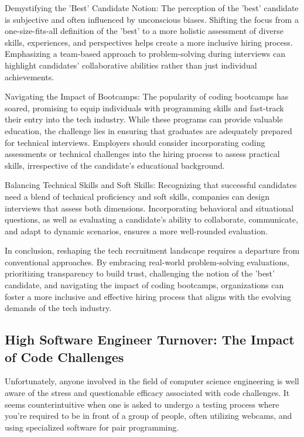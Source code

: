 \documentclass[
    a4paper, %
    10pt, %
    unnumberedsections, %
    twoside, %
]{LTJournalArticle}
\begin{document}
Demystifying the 'Best' Candidate Notion:
The perception of the 'best' candidate is subjective and often influenced by unconscious biases. Shifting the focus from a one-size-fits-all definition of the 'best' to a more holistic assessment of diverse skills, experiences, and perspectives helps create a more inclusive hiring process. Emphasizing a team-based approach to problem-solving during interviews can highlight candidates' collaborative abilities rather than just individual achievements.

Navigating the Impact of Bootcamps:
The popularity of coding bootcamps has soared, promising to equip individuals with programming skills and fast-track their entry into the tech industry. While these programs can provide valuable education, the challenge lies in ensuring that graduates are adequately prepared for technical interviews. Employers should consider incorporating coding assessments or technical challenges into the hiring process to assess practical skills, irrespective of the candidate's educational background.

Balancing Technical Skills and Soft Skills:
Recognizing that successful candidates need a blend of technical proficiency and soft skills, companies can design interviews that assess both dimensions. Incorporating behavioral and situational questions, as well as evaluating a candidate's ability to collaborate, communicate, and adapt to dynamic scenarios, ensures a more well-rounded evaluation.

In conclusion, reshaping the tech recruitment landscape requires a departure from conventional approaches. By embracing real-world problem-solving evaluations, prioritizing transparency to build trust, challenging the notion of the 'best' candidate, and navigating the impact of coding bootcamps, organizations can foster a more inclusive and effective hiring process that aligns with the evolving demands of the tech industry.




\subsection{High Software Engineer Turnover: The Impact of Code Challenges}

Unfortunately, anyone involved in the field of computer science engineering is well aware of the stress and questionable efficacy associated with code challenges. It seems counterintuitive when one is asked to undergo a testing process where you're required to be in front of a group of people, often utilizing webcams, and using specialized software for pair programming.
\end{document}
